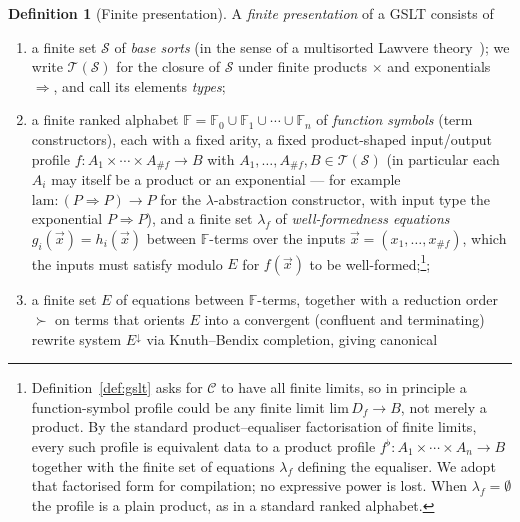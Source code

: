 \documentclass[11pt]{article}
\theoremstyle{plain}
\theoremstyle{definition}
\newtheorem{definition}[theorem]{Definition}
\theoremstyle{remark}
\newcommand{\arity}[1]{\##1}
\begin{document}
\begin{definition}[Finite presentation]\label{def:presentation}
A \emph{finite presentation} of a GSLT consists of
\begin{enumerate}[leftmargin=*]
  \item a finite set $\mathcal{S}$ of \emph{base sorts} (in the sense
        of a multisorted Lawvere theory~\cite{TrimbleNLabLawvere}); we
        write
        $\mathcal{T}(\mathcal{S})$ for the closure of $\mathcal{S}$
        under finite products $\times$ and exponentials $\Rightarrow$,
        and call its elements \emph{types};
  \item a finite ranked alphabet
        $\mathbb{F} = \mathbb{F}_0 \cup \mathbb{F}_1 \cup \cdots \cup \mathbb{F}_n$
        of \emph{function symbols} (term constructors), each with a
        fixed arity, a fixed product-shaped input/output profile
        $f : A_1 \times \cdots \times A_{\arity{f}} \to B$ with
        $A_1, \ldots, A_{\arity{f}}, B \in \mathcal{T}(\mathcal{S})$
        (in particular each $A_i$ may itself be a product or an
        exponential --- for example $\mathrm{lam} : (P \Rightarrow P) \to P$
        for the $\lambda$-abstraction constructor, with input type
        the exponential $P \Rightarrow P$), and a finite set
        $\lambda_f$ of \emph{well-formedness equations}
        $g_i(\vec{x}) = h_i(\vec{x})$ between $\mathbb{F}$-terms over the
        inputs $\vec{x} = (x_1, \ldots, x_{\arity{f}})$, which the
        inputs must satisfy modulo $E$ for $f(\vec{x})$ to be
        well-formed;\footnote{Definition~\ref{def:gslt} asks for $\mathcal{C}$
        to have all finite limits, so in principle a function-symbol
        profile could be any finite limit $\mathrm{lim}\,D_f \to B$, not
        merely a product. By the standard product--equaliser
        factorisation of finite limits, every such profile is
        equivalent data to a product profile $f^{\flat} : A_1 \times
        \cdots \times A_n \to B$ together with the finite set of
        equations $\lambda_f$ defining the equaliser. We adopt that
        factorised form for compilation; no expressive power is lost.
        When $\lambda_f = \emptyset$ the profile is a plain product, as
        in a standard ranked alphabet.};
  \item a finite set $E$ of equations between $\mathbb{F}$-terms,
        together with a reduction order $\succ$ on terms that orients
        $E$ into a convergent (confluent and terminating) rewrite system
        $E^{\downarrow}$ via Knuth--Bendix completion, giving canonical

\end{enumerate}
\end{definition}
\end{document}
